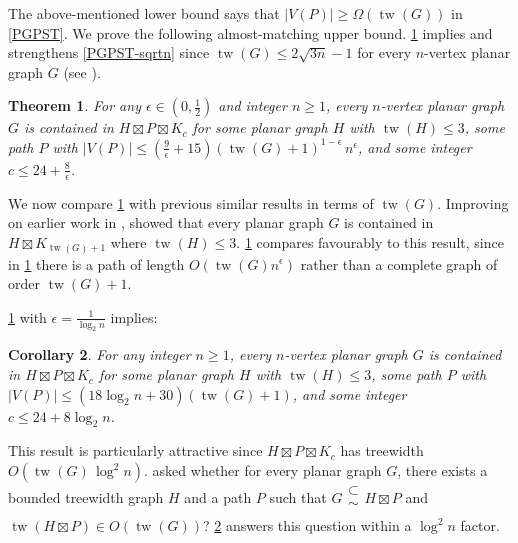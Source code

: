 \documentclass[11pt]{article}
\renewcommand{\geq}{\geqslant}
\renewcommand{\leq}{\leqslant}
\newcommand{\subsetsim}{\mathrel{\substack{\textstyle\subset\\[-0.3ex]\textstyle\sim\\[-0.4ex]}}}
\newcommand{\StrongProd}{\mathbin{\boxtimes}}
\DeclareMathOperator{\tw}{tw}
\theoremstyle{plain}
\newtheorem{thm}{Theorem}
\newtheorem{cor}[thm]{Corollary}
\theoremstyle{definition}
\begin{document}
	The above-mentioned lower bound says that $|V(P)|\geq \Omega(\tw(G))$ in \cref{PGPST}. 
	We prove the following almost-matching upper bound. \cref{PGPST-tw}  implies and strengthens \cref{PGPST-sqrtn} since $\tw(G)\leq 2\sqrt{3n}-1$ for every $n$-vertex planar graph $G$ (see \citep[Lemma~10~and~Theorem~12]{DMW17}).  

	\begin{thm}
		\label{PGPST-tw} 
		For any $\epsilon\in (0,\frac12)$ and integer $n\geq 1$, every $n$-vertex planar graph $G$ is contained in $H \StrongProd P \StrongProd K_c$ for some planar graph $H$ with $\tw(H)\leq 3$, some path $P$ with $|V(P)|\leq (\frac{9}{\epsilon}+15 )(\tw(G)+1)^{1-\epsilon}\,n^{\epsilon}$, and some integer $c\leq 24+\frac{8}{\epsilon}$.
	\end{thm}
	
	We now compare \cref{PGPST-tw} with previous similar results in terms of $\tw(G)$. Improving on earlier work in \citep{UTW}, \citet{ISW24} showed that every planar graph $G$ is contained in $H\boxtimes K_{\tw(G)+1}$ where $\tw(H)\leq 3$. \cref{PGPST-tw} compares favourably to this result, since in \cref{PGPST-tw} there is a path of length $O(\tw(G)n^\epsilon)$ rather than a complete graph of order $\tw(G)+1$.
	
	\cref{PGPST-tw} with $\epsilon=\frac{1}{\log_2 n}$ implies:
	
	\begin{cor}
		\label{PGPST-log} 
		For any integer $n\geq 1$, every $n$-vertex planar graph $G$ is contained in $H \StrongProd P \StrongProd K_c$ for some planar graph $H$ with $\tw(H)\leq 3$, some path $P$ with $|V(P)|\leq (18\log_2n+30) (\tw(G)+1)$, and some integer $c\leq 24 +8\log_2 n$.
	\end{cor}
	
	This result is particularly attractive since 
	$H \StrongProd P \StrongProd K_c$ has treewidth  $O(\tw(G)\,\log^2n)$. \citet{DMWW} asked whether for every planar graph $G$, there exists a bounded treewidth graph $H$ and a path $P$ such that $G\subsetsim H\boxtimes P$ and $\tw(H\boxtimes P) \in O(\tw(G))$? \cref{PGPST-log} answers this question within a $\log^2 n$ factor. 
		
\end{document}
